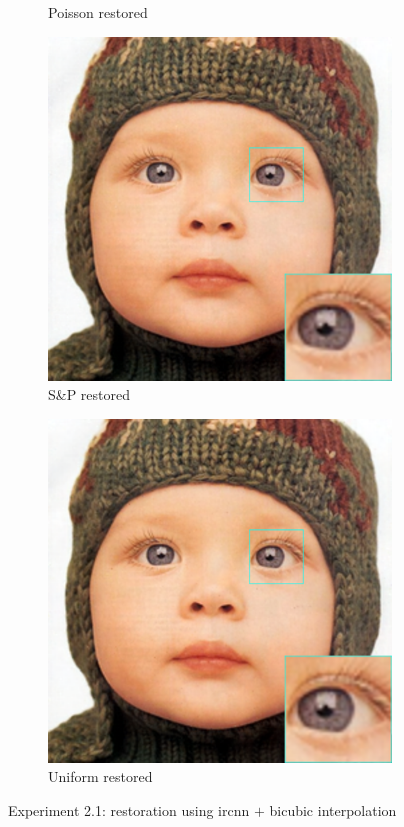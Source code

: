 \begin{figure}
\begin{subfigure}{0.24\textwidth}
		\caption{Poisson restored}
	\end{subfigure}
	\begin{subfigure}{0.24\textwidth}
		\includegraphics[width=\textwidth]{images/exp2.1/salt.png}
		\caption{S\&P restored}
	\end{subfigure}
	\begin{subfigure}{0.24\textwidth}
		\includegraphics[width=\textwidth]{images/exp2.1/uniform.png}
		\caption{Uniform restored}
	\end{subfigure}
	\caption{Experiment 2.1: restoration using \gls{ircnn} $+$ bicubic interpolation}
	\label{fig:exp2.1}
\end{figure}



